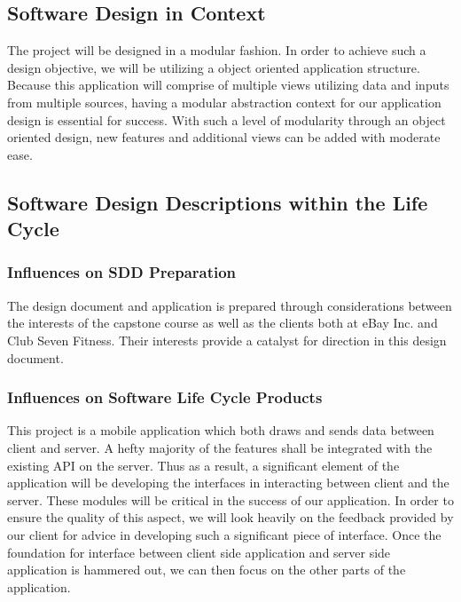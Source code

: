 \documentclass[letterpaper,10pt,titlepage]{article}
\begin{document}
\subsection{Software Design in Context}
The project will be designed in a modular fashion. In order to achieve such a design objective, we will be utilizing a object oriented application structure. Because this application will comprise of multiple views utilizing data and inputs from multiple sources, having a modular abstraction context for our application design is essential for success. With such a level of modularity through an object oriented design, new features and additional views can be added with moderate ease.

\subsection{Software Design Descriptions within the Life Cycle}

\subsubsection{Influences on SDD Preparation}
The design document and application is prepared through considerations between the interests of the capstone course as well as the clients both at eBay Inc. and Club Seven Fitness. Their interests provide a catalyst for direction in this design document.

\subsubsection{Influences on Software Life Cycle Products}
This project is a mobile application which both draws and sends data between client and server. A hefty majority of the features shall be integrated with the existing API on the server. Thus as a result, a significant element of the application will be developing the interfaces in interacting between client and the server. These modules will be critical in the success of our application. In order to ensure the quality of this aspect, we will look heavily on the feedback provided by our client for advice in developing such a significant piece of interface. Once the foundation for interface between client side application and server side application is hammered out, we can then focus on the other parts of the application.
\end{document}
